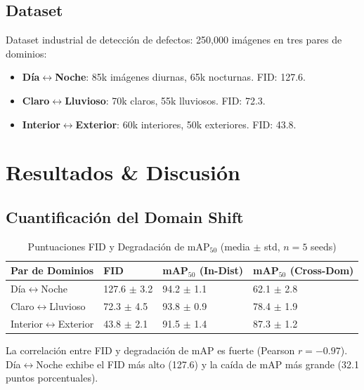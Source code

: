 \documentclass[10pt,twocolumn,letterpaper]{article}
\begin{document}
\subsection{Dataset}
Dataset industrial de detección de defectos: 250,000 imágenes en tres pares de dominios:
\begin{itemize}
    \item \textbf{Día$\leftrightarrow$Noche}: 85k imágenes diurnas, 65k nocturnas. FID: 127.6.
    \item \textbf{Claro$\leftrightarrow$Lluvioso}: 70k claros, 55k lluviosos. FID: 72.3.
    \item \textbf{Interior$\leftrightarrow$Exterior}: 60k interiores, 50k exteriores. FID: 43.8.
\end{itemize}

\section{Resultados \& Discusión}
\subsection{Cuantificación del Domain Shift}
\begin{table}[htbp]
\centering
\caption{Puntuaciones FID y Degradación de mAP$_{50}$ (media $\pm$ std, $n=5$ seeds)}
\label{tab:fid}
\begin{tabular}{@{}llll@{}}
\toprule
\textbf{Par de Dominios} & \textbf{FID} & \textbf{mAP$_{50}$ (In-Dist)} & \textbf{mAP$_{50}$ (Cross-Dom)} \\ \midrule
Día$\leftrightarrow$Noche & 127.6 $\pm$ 3.2 & 94.2 $\pm$ 1.1 & 62.1 $\pm$ 2.8 \\
Claro$\leftrightarrow$Lluvioso & 72.3 $\pm$ 4.5 & 93.8 $\pm$ 0.9 & 78.4 $\pm$ 1.9 \\
Interior$\leftrightarrow$Exterior & 43.8 $\pm$ 2.1 & 91.5 $\pm$ 1.4 & 87.3 $\pm$ 1.2 \\
\bottomrule
\end{tabular}
\end{table}

La correlación entre FID y degradación de mAP es fuerte (Pearson $r = -0.97$). Día$\leftrightarrow$Noche exhibe el FID más alto (127.6) y la caída de mAP más grande (32.1 puntos porcentuales).
\end{document}
